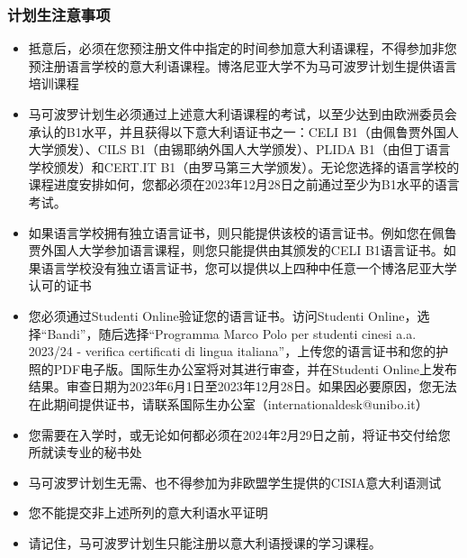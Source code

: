 \subsubsection{计划生注意事项}
\begin{itemize}
\item 抵意后，必须在您预注册文件中指定的时间参加意大利语课程，不得参加非您预注册语言学校的意大利语课程。博洛尼亚大学不为马可波罗计划生提供语言培训课程 
\item 马可波罗计划生必须通过上述意大利语课程的考试，以至少达到由欧洲委员会承认的B1水平，并且获得以下意大利语证书之一：CELI B1（由佩鲁贾外国人大学颁发）、CILS B1（由锡耶纳外国人大学颁发）、PLIDA B1（由但丁语言学校颁发）和CERT.IT B1（由罗马第三大学颁发）。无论您选择的语言学校的课程进度安排如何，您都必须在2023年12月28日之前通过至少为B1水平的语言考试。
\item 如果语言学校拥有独立语言证书，则只能提供该校的语言证书。例如您在佩鲁贾外国人大学参加语言课程，则您只能提供由其颁发的CELI B1语言证书。如果语言学校没有独立语言证书，您可以提供以上四种中任意一个博洛尼亚大学认可的证书 
\item 您必须通过Studenti Online验证您的语言证书。访问Studenti Online，选择“Bandi”，随后选择“Programma Marco Polo per studenti cinesi a.a. 2023/24 - verifica certificati di lingua italiana”，上传您的语言证书和您的护照的PDF电子版。国际生办公室将对其进行审查，并在Studenti Online上发布结果。审查日期为2023年6月1日至2023年12月28日。如果因必要原因，您无法在此期间提供证书，请联系国际生办公室（internationaldesk@unibo.it）
\item 您需要在入学时，或无论如何都必须在2024年2月29日之前，将证书交付给您所就读专业的秘书处
\item 马可波罗计划生无需、也不得参加为非欧盟学生提供的CISIA意大利语测试
\item 您不能提交非上述所列的意大利语水平证明
\item 请记住，马可波罗计划生只能注册以意大利语授课的学习课程。
\end{itemize}


